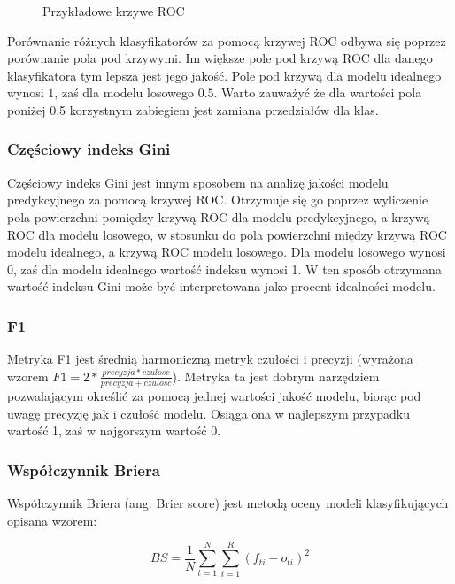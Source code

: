 \documentclass[a4paper, twoside, 11pt, openright]{article}
\begin{document}
\begin{figure}[H]
\caption{Przykładowe krzywe ROC \cite{roccurves} }%
\label{roc}
\end{figure}


Porównanie różnych klasyfikatorów za pomocą krzywej ROC odbywa się poprzez porównanie pola pod krzywymi. Im większe pole pod krzywą ROC dla danego klasyfikatora tym lepsza jest jego jakość. Pole pod krzywą dla modelu idealnego wynosi $1$, zaś dla modelu losowego $0.5$. Warto zauważyć że dla wartości pola poniżej 0.5  korzystnym zabiegiem jest zamiana przedziałów dla klas.


\subsubsection{Częściowy indeks Gini} %


Częściowy indeks Gini jest innym sposobem na analizę jakości modelu predykcyjnego za pomocą krzywej ROC. Otrzymuje się go poprzez wyliczenie pola powierzchni pomiędzy krzywą ROC dla modelu predykcyjnego, a krzywą ROC dla modelu losowego, w stosunku do pola powierzchni między krzywą ROC modelu idealnego, a krzywą ROC modelu losowego. Dla modelu losowego wynosi 0, zaś dla modelu idealnego wartość indeksu wynosi 1. W ten sposób otrzymana wartość indeksu Gini może być interpretowana jako procent idealności modelu.

\subsubsection{F1} %

Metryka F1 jest średnią harmoniczną metryk czułości i precyzji (wyrażona wzorem $F1=2*\frac{precyzja*czulosc}{precyzja+czulosc}$). Metryka ta jest dobrym narzędziem pozwalającym określić za pomocą jednej wartości jakość modelu, biorąc pod uwagę precyzję jak i czułość modelu. Osiąga ona w najlepszym przypadku wartość 1, zaś w najgorszym wartość 0. 

\subsubsection{Współczynnik Briera \cite{brier}}

Współczynnik Briera (ang. Brier score) jest metodą oceny modeli klasyfikujących opisana wzorem:

$$	BS=\frac{1}{N} \sum_{t=1}^{N} \sum_{i=1}^{R}(f_{ti}-o_{ti})^2 $$
\end{document}
